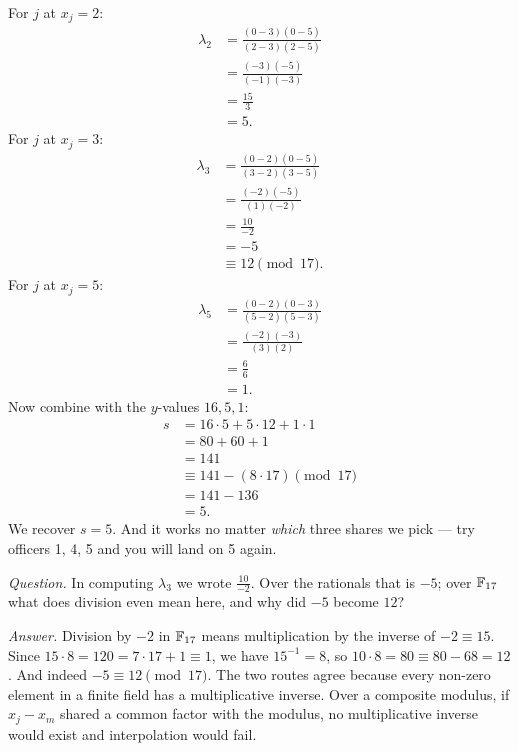 For $j$ at $x_j = 2$:
\begin{align*}
  \lambda_2 &= \frac{(0-3)(0-5)}{(2-3)(2-5)} \\
            &= \frac{(-3)(-5)}{(-1)(-3)} \\
            &= \frac{15}{3} \\
            &= 5.
\end{align*}
For $j$ at $x_j = 3$:
\begin{align*}
  \lambda_3 &= \frac{(0-2)(0-5)}{(3-2)(3-5)} \\
            &= \frac{(-2)(-5)}{(1)(-2)} \\
            &= \frac{10}{-2} \\
            &= -5 \\
            &\equiv 12 \pmod{17}.
\end{align*}
For $j$ at $x_j = 5$:
\begin{align*}
  \lambda_5 &= \frac{(0-2)(0-3)}{(5-2)(5-3)} \\
            &= \frac{(-2)(-3)}{(3)(2)} \\
            &= \frac{6}{6} \\
            &= 1.
\end{align*}
Now combine with the $y$-values $16, 5, 1$:
\begin{align*}
  s &= 16\cdot 5 + 5\cdot 12 + 1\cdot 1 \\
    &= 80 + 60 + 1 \\
    &= 141 \\
    &\equiv 141 - (8\cdot 17) \pmod{17} \\
    &= 141 - 136 \\
    &= 5.
\end{align*}
We recover $s = 5$. And it works no matter \emph{which} three shares we pick --- try officers 1, 4, 5 and you will land on 5 again.

\begin{walkbox}
\emph{Question.} In computing $\lambda_3$ we wrote $\frac{10}{-2}$. Over the rationals that is $-5$; over $\mathbb{F}_{17}$ what does division even mean here, and why did $-5$ become $12$?

\emph{Answer.} Division by $-2$ in $\mathbb{F}_{17}$ means multiplication by the inverse of $-2 \equiv 15$. Since $15 \cdot 8 = 120 = 7\cdot 17 + 1 \equiv 1$, we have $15^{-1} = 8$, so $10 \cdot 8 = 80 \equiv 80 - 68 = 12$. And indeed $-5 \equiv 12 \pmod{17}$. The two routes agree because every non-zero element in a finite field has a multiplicative inverse. Over a composite modulus, if $x_j - x_m$ shared a common factor with the modulus, no multiplicative inverse would exist and interpolation would fail.
\end{walkbox}

